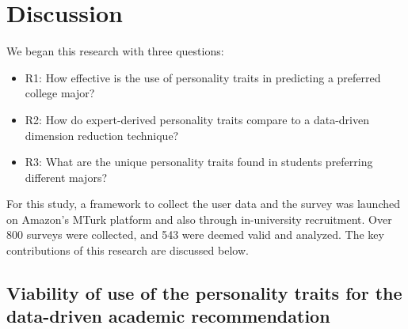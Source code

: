 \documentclass[conference]{IEEEtran}
\begin{document}



\section{Discussion}\label{sec5}
We began this research with three questions:
\begin{itemize}
    \item R1: How effective is the use of personality traits in predicting a preferred college major?
    \item R2: How do expert-derived personality traits compare to a data-driven dimension reduction technique?
    \item R3: What are the unique personality traits found in students preferring different majors?
\end{itemize}
For this study, a framework to collect the user data and the survey was launched on
Amazon’s MTurk platform and also through in-university recruitment. Over 800
surveys were collected, and 543 were deemed valid and analyzed. The key contributions of this research are discussed below.

\subsection{Viability of use of the personality traits for the data-driven academic
recommendation} \label{subsubsec5}
\end{document}
